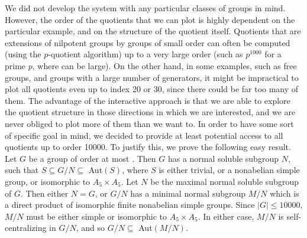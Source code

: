 We did not develop the system with any particular classes of groups in mind.
However, the order of the quotients that we can plot is highly dependent on the
particular example, and on the structure of the quotient itself.
Quotients that are
extensions of nilpotent groups by groups of small order can often be computed
(using the $p$-quotient algorithm) up to a very large order (such as
$p^{1000}$ for a prime $p$, where can be large). 	
On the other hand, in some examples, such as free groups, and
groups with a large number of generators, it might be impractical to plot all
quotients even up to index 20 or 30, since there could be far too many of them.
The advantage of the
interactive approach is that we are able to explore the quotient structure
in those directions in which we are interested, and we are never obliged to
plot more of them than we want to. In order to have some sort of
specific goal in mind, we decided to provide at least
potential access to all quotients up to order 10000.
To justify this, we prove the following easy result.
Let $G$ be a group of order at most . Then $G$ has a normal soluble
subgroup $N$, such that $S \subseteq G/N \subseteq $ Aut$(S)$, where $S$ is
either trivial, or a nonabelian simple group, or isomorphic to $A_5 \times
A_5$.
\endproclaim
{}
Let $N$ be the maximal normal soluble subgroup of $G$. Then either $N = G$, or
$G/N$ has a minimal normal subgroup $M/N$ which is a direct product of
isomorphic finite nonabelian simple groups. Since $|G| \leq 10000$,
$M/N$ must be either simple or isomorphic to $A_5 \times A_5$. In either case,
$M/N$ is self-centralizing in $G/N$, and so $G/N \subseteq $ Aut$(M/N)$.
\enddemo

